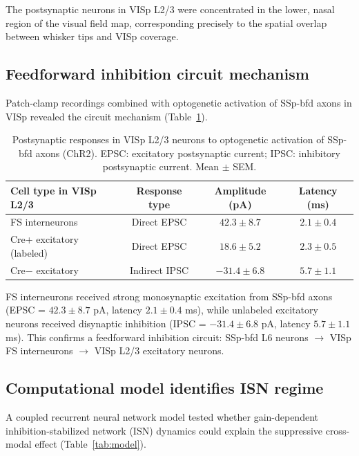 \documentclass[11pt]{article}
\begin{document}
The postsynaptic neurons in VISp L2/3 were concentrated in the lower, nasal region of the visual field map, corresponding precisely to the spatial overlap between whisker tips and VISp coverage.

\subsection{Feedforward inhibition circuit mechanism}

Patch-clamp recordings combined with optogenetic activation of SSp-bfd axons in VISp revealed the circuit mechanism (Table~\ref{tab:ephys}).

\begin{table}[H]
\centering
\caption{Postsynaptic responses in VISp L2/3 neurons to optogenetic activation of SSp-bfd axons (ChR2). EPSC: excitatory postsynaptic current; IPSC: inhibitory postsynaptic current. Mean $\pm$ SEM.}
\label{tab:ephys}
\begin{tabular}{lccc}
\toprule
\textbf{Cell type in VISp L2/3} & \textbf{Response type} & \textbf{Amplitude (pA)} & \textbf{Latency (ms)} \\
\midrule
FS interneurons & Direct EPSC & $42.3 \pm 8.7$ & $2.1 \pm 0.4$ \\
Cre+ excitatory (labeled) & Direct EPSC & $18.6 \pm 5.2$ & $2.3 \pm 0.5$ \\
Cre$-$ excitatory & Indirect IPSC & $-31.4 \pm 6.8$ & $5.7 \pm 1.1$ \\
\bottomrule
\end{tabular}
\end{table}

FS interneurons received strong monosynaptic excitation from SSp-bfd axons (EPSC = $42.3 \pm 8.7$ pA, latency $2.1 \pm 0.4$ ms), while unlabeled excitatory neurons received disynaptic inhibition (IPSC = $-31.4 \pm 6.8$ pA, latency $5.7 \pm 1.1$ ms). This confirms a feedforward inhibition circuit: SSp-bfd L6 neurons $\rightarrow$ VISp FS interneurons $\rightarrow$ VISp L2/3 excitatory neurons.

\subsection{Computational model identifies ISN regime}

A coupled recurrent neural network model tested whether gain-dependent inhibition-stabilized network (ISN) dynamics could explain the suppressive cross-modal effect (Table~\ref{tab:model}).
\end{document}
